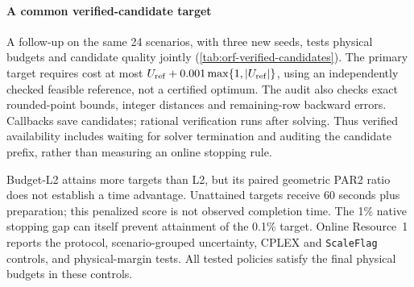 \paragraph{A common verified-candidate target}
A follow-up on the same 24 scenarios, with three new seeds, tests physical
budgets and candidate quality jointly (\cref{tab:orf-verified-candidates}).
The primary target requires cost at most
$U_{\rm ref}+0.001\max\{1,|U_{\rm ref}|\}$, using an independently checked
feasible reference, not a certified optimum. The audit also checks exact
rounded-point bounds, integer distances and remaining-row backward errors.
Callbacks save candidates; rational verification runs after solving.
Thus verified availability includes waiting for solver termination and auditing
the candidate prefix, rather than measuring an online stopping rule.

Budget-L2 attains more targets than L2, but its paired geometric PAR2 ratio
does not establish a time advantage. Unattained targets receive 60 seconds
plus preparation; this penalized score is not observed completion time.
The 1\% native stopping gap can itself prevent attainment of the 0.1\% target.
Online Resource~1 reports the protocol, scenario-grouped uncertainty, CPLEX and
\texttt{ScaleFlag} controls, and physical-margin tests. All tested policies
satisfy the final physical budgets in these controls.

